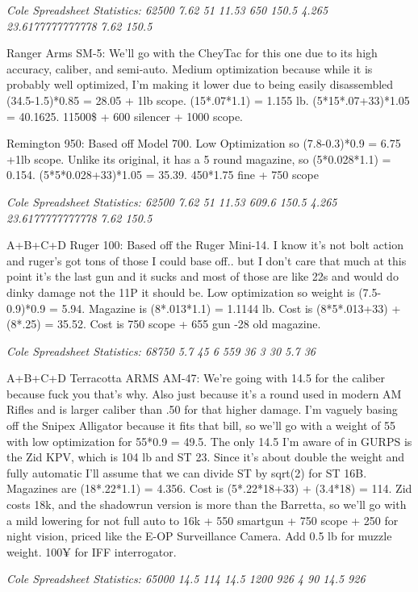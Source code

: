 \begin{multicols*}{2}
	\textit{\textcolor{OliveGreen}{Cole Spreadsheet Statistics: 62500 7.62 51 11.53 650 150.5 4.265 23.6177777777778 7.62 150.5}}
	
	Ranger Arms SM-5: We'll go with the CheyTac for this one due to its high accuracy, caliber, and semi-auto. Medium optimization because while it is probably well optimized, I'm making it lower due to being easily disassembled (34.5-1.5)*0.85 = 28.05 + 1lb scope. (15*.07*1.1)  = 1.155 lb. (5*15*.07+33)*1.05 = 40.1625. 11500\$ + 600 silencer +  1000 scope.
	
	Remington 950: Based off Model 700.  Low Optimization so (7.8-0.3)*0.9 = 6.75 +1lb scope.   Unlike its original, it has a 5 round magazine, so (5*0.028*1.1) = 0.154. (5*5*0.028+33)*1.05 = 35.39. 450*1.75 fine + 750 scope 
	
	\textit{\textcolor{OliveGreen}{Cole Spreadsheet Statistics: 62500 7.62 51 11.53 609.6 150.5 4.265 23.6177777777778 7.62 150.5}}
	
	A+B+C+D
	Ruger 100: Based off the Ruger Mini-14. I know it's not bolt action and ruger's got tons of those I could base off.. but I don't care that much at this point it's the last gun and it sucks and most of those are like 22s and would do dinky damage not the 11P it should be. Low optimization so weight is (7.5-0.9)*0.9 = 5.94. Magazine is (8*.013*1.1) = 1.1144 lb. Cost is (8*5*.013+33) + (8*.25) = 35.52. Cost is 750 scope + 655 gun -28 old magazine.
	
	\textit{\textcolor{OliveGreen}{Cole Spreadsheet Statistics: 68750 5.7 45 6 559 36 3 30 5.7 36}}
	
	A+B+C+D
	Terracotta ARMS AM-47:  We're going with 14.5 for the caliber because fuck you that's why. Also just because it's a round used in modern AM Rifles and is larger caliber than .50 for that higher damage. I'm vaguely basing off the Snipex Alligator because it fits that bill, so we'll go with a weight of 55 with low optimization for 55*0.9 = 49.5. The only 14.5 I'm aware of in GURPS is the Zid KPV, which is 104 lb and ST 23.  Since it's about double the weight and fully automatic I'll assume that we can divide ST by sqrt(2)  for ST 16B. Magazines are (18*.22*1.1) =  4.356. Cost is (5*.22*18+33) + (3.4*18) = 114. Zid costs 18k,  and the shadowrun version is more than the Barretta, so we'll go with a mild lowering for not full auto to 16k + 550 smartgun + 750 scope + 250 for night vision, priced like the E-OP Surveillance Camera. Add 0.5 lb for muzzle weight. 100¥ for IFF interrogator.
	
	\textit{\textcolor{OliveGreen}{Cole Spreadsheet Statistics: 65000 14.5 114 14.5 1200 926 4 90 14.5 926}}


\end{multicols*}
